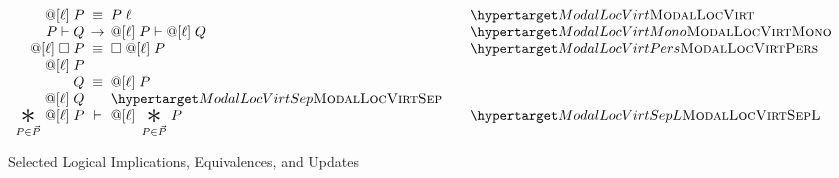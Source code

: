 \begin{figure}
  \[
  \begin{array}{r@{\;}c@{\;}lll}
\modaldef\ell\modalP
& \logequiv &
\modaldefunfold\ell\modalP
&& \TirNameStyle{ModalLocVirt}
\\

\modalP \vdash \modalQ & \rightarrow & \modaldef\ell\modalP \vdash \modaldef\ell\modalQ && \TirNameStyle{ModalLocVirtMono}
\\

\modaldefper\ell\modalP
&\logequiv & \outsidemodaldefper\ell\modalP && \TirNameStyle{ModalLocVirtPers}
\\

\modaldef\ell{\modalstar\modalP\modalQ} & \logequiv & \modaldef\ell\modalP \star \modaldef\ell\modalQ &&\TirNameStyle{ModalLocVirtSep}
\\

   \bigast{\modalP \in \modalPs\modalP} { \modaldef\ell\modalP } & \vdash &
   \modaldef\ell{\bigast{\modalP \in \modalPs\modalP} {\modalP}} && \TirNameStyle{ModalLocVirtSepL}
  \end{array}
  \]
\caption{Selected Logical Implications, Equivalences, and Updates}
\label{fig:laws}
\end{figure}
